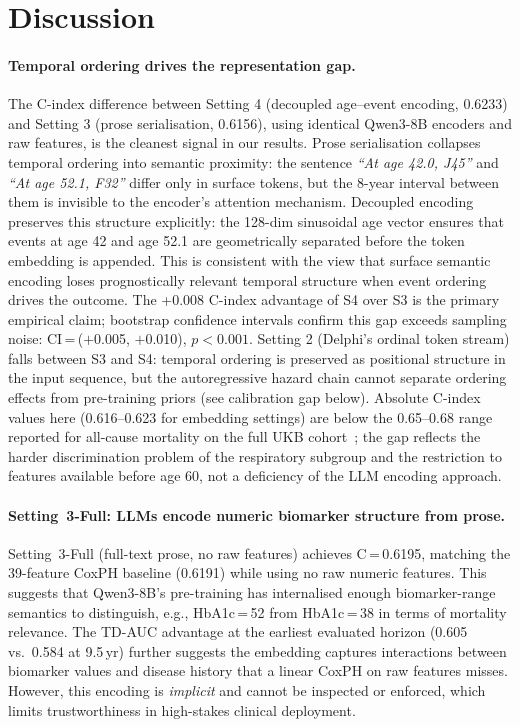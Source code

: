 \section{Discussion}

\paragraph{Temporal ordering drives the representation gap.}
The C-index difference between Setting 4 (decoupled age--event encoding,
0.6233) and Setting 3 (prose serialisation, 0.6156), using identical
Qwen3-8B encoders and raw features, is the cleanest signal in our
results.
Prose serialisation collapses temporal ordering into semantic proximity:
the sentence \textit{``At age 42.0, J45''} and \textit{``At age 52.1, F32''}
differ only in surface tokens, but the 8-year interval between them is
invisible to the encoder's attention mechanism.
Decoupled encoding preserves this structure explicitly: the 128-dim
sinusoidal age vector ensures that events at age 42 and age 52.1 are
geometrically separated before the token embedding is appended.
This is consistent with the view that surface semantic encoding loses
prognostically relevant temporal structure when event ordering drives
the outcome.
The +0.008 C-index advantage of S4 over S3 is the primary empirical claim;
bootstrap confidence intervals confirm this gap exceeds sampling noise:
CI\,=\,($+$0.005, $+$0.010), $p<0.001$.
Setting 2 (Delphi's ordinal token stream) falls between S3 and S4:
temporal ordering is preserved as positional structure in the input
sequence, but the autoregressive hazard chain cannot separate
ordering effects from pre-training priors (see calibration gap below).
Absolute C-index values here (0.616--0.623 for embedding settings) are
below the 0.65--0.68 range reported for all-cause mortality on the full
UKB cohort~\cite{ukbmdrmf}; the gap reflects the harder discrimination
problem of the respiratory subgroup and the restriction to features
available before age 60, not a deficiency of the LLM encoding approach.

\paragraph{Setting~3-Full: LLMs encode numeric biomarker structure from prose.}
Setting~3-Full (full-text prose, no raw features) achieves C\,=\,0.6195,
matching the 39-feature CoxPH baseline (0.6191) while using no raw
numeric features.
This suggests that Qwen3-8B's pre-training has internalised enough
biomarker-range semantics to distinguish, e.g., HbA1c\,=\,52 from
HbA1c\,=\,38 in terms of mortality relevance.
The TD-AUC advantage at the earliest evaluated horizon (0.605 vs.\ 0.584 at 9.5\,yr) further
suggests the embedding captures interactions between biomarker values and
disease history that a linear CoxPH on raw features misses.
However, this encoding is \emph{implicit} and cannot be inspected or
enforced, which limits trustworthiness in high-stakes clinical deployment.

